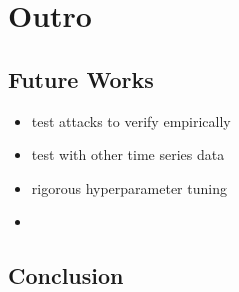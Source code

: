 \section{Outro}

\subsection{Future Works}
\begin{itemize}
    \item test attacks to verify empirically
    \item test with other time series data
    \item rigorous hyperparameter tuning
    \item 
\end{itemize}
\subsection{Conclusion}